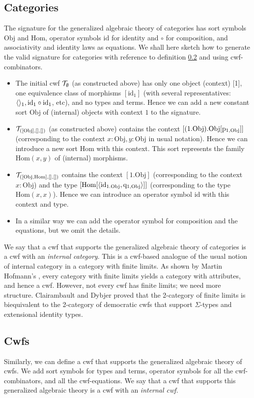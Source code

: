 \documentclass{lmcs}
\def\Obj{\mathrm{Obj}}
\def\Hom{\mathrm{Hom}}
\def\id{\mathrm{id}}
\begin{document}
\subsection{Categories} 
The signature for the generalized algebraic theory of categories has sort symbols $\Obj$ 
and $\Hom$, operator symbols $\id$ for identity and $\circ$ for composition, and associativity and identity laws as equations. We shall here sketch how to generate the valid signature for categories with reference to definition \ref{} and using cwf-combinators.
\begin{itemize}
\item The initial cwf ${\mathcal T}_\emptyset$ (as constructed above) has only one object (context) [1], one equivalence class of morphisms $[\id_1]$ (with several representatives: $\tuple{}_1, \id_1 \circ \id_1$, etc), and no types and terms. Hence we can add a new constant sort $\Obj$ of (internal) objects with context $1$ to the signature. 
\item $\T_{([\Obj],[],[])}$ (as constructed above) contains the context $[(1.\Obj).\Obj[\p_{1,\Obj}]]$ (corresponding to the context $x : \Obj, y : \Obj$ in usual notation). Hence we can introduce a new sort $\Hom$ with this context. This sort represents the family $\Hom(x,y)$ of (internal) morphisms.
\item $\T_{([\Obj, \Hom],[],[])}$ contains the context $[1.\Obj]$ (corresponding to the context $x : \Obj$) and the type $[\Hom[\tuple{\id_{1.\Obj},\q_{1,\Obj}}]]$ (corresponding to the type $\Hom(x,x)$). Hence we can introduce an operator symbol $\id$ with this context and type.
\item In a similar way we can add the operator symbol for composition and the equations, but we omit the details.
\end{itemize}

We say that a cwf that supports the generalized algebraic theory of categories is a cwf with an {\em internal category}. This is a cwf-based analogue of the usual notion of internal category in a category with finite limits. As shown by Martin Hofmann's \cite{hofmann:csl,hofmann:cambridge}, every category with finite limits yields a category with attributes, and hence a cwf. However, not every cwf has finite limits; we need more structure.  Clairambault and Dybjer \cite{ClairambaultD11,ClairambaultD14} proved that the 2-category of finite limits is biequivalent to the 2-category of democratic cwfs that support $\Sigma$-types and extensional identity types.

\subsection{Cwfs} Similarly, we can define a cwf that supports the generalized algebraic theory of cwfs. We add sort symbols for types and terms, operator symbols for all the cwf-combinators, and all the cwf-equations. We say that a cwf that supports this generalized algebraic theory is a cwf with an {\em internal cwf}.
\end{document}
